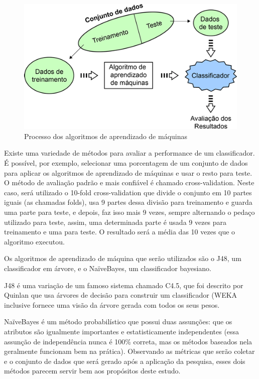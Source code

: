 \begin{figure}[p]
	\centering
	\includegraphics[scale=0.7]{figs/training-datasets-pequeno.png}
	\caption{\label{fig_1}Processo dos algoritmos de aprendizado de máquinas}
\end{figure}

Existe uma variedade de métodos para avaliar a performance de um classificador. É possível, por exemplo, selecionar uma porcentagem de um conjunto de dados para aplicar os algoritmos de aprendizado de máquinas e usar o resto para teste. O método de avaliação padrão e mais confiável é chamado cross-validation. Neste caso, será utilizado o 10-fold cross-validation que divide o conjunto em 10 partes iguais (as chamadas folds), usa 9 partes dessa divisão para treinamento e guarda uma parte para teste, e depois, faz isso mais 9 vezes, sempre alternando o pedaço utilizado para teste, assim, uma determinada parte é usada 9 vezes para treinamento e uma para teste. O resultado será a média das 10 vezes que o algoritmo executou.

Os algoritmos de aprendizado de máquina que serão utilizados são o J48, um classificador em árvore, e o NaïveBayes, um classificador bayesiano.

J48 é uma variação de um famoso sistema chamado C4.5, que foi descrito por Quinlan \cite{Quinlan1993} que usa árvores de decisão para construir um classificador (WEKA inclusive fornece uma visão da árvore gerada com todos os seus pesos.

NaïveBayes é um método probabilístico que possui duas assunções: que os atributos são igualmente importantes e estatisticamente independentes (essa assunção de independência nunca é 100\% correta, mas os métodos baseados nela geralmente funcionam bem na prática). Observando as métricas que serão coletar e o conjunto de dados que será gerado após a aplicação da pesquisa, esses dois métodos parecem servir bem aos propósitos deste estudo.

